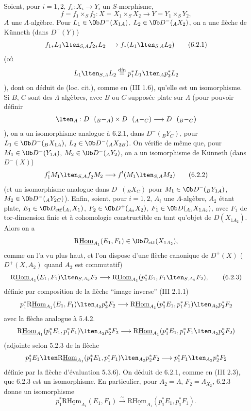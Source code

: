 Soient, pour $i=1,2$, $f_i:X_i\to Y_i$ un $S$-morphisme,
\[
f=f_1\times_S f_2:X=X_1\times_SX_2\longrightarrow Y=Y_1\times_SY_2,
\]
$A$ une $\Lambda$-algèbre.
Pour $L_1\in\Ob D^-(X_{1A})$, $L_2\in\Ob D^-({}_AX_2)$, on a une flèche de Künneth (dans $D^-(Y)$)
\begin{equation}
f_{1*}L_1\lten_{S,A}f_{2*}L_2
\longrightarrow
f_*(L_1\lten_{S,A}L_2)
\tag{6.2.1}
\end{equation}
(où
\[
L_1\lten_{S,A}L_2
\stackrel{\mathrm{dfn}}{=}p_1^*L_1\lten_Ap_2^*L_2
\]),
dont on déduit de (loc. cit.), comme en (III 1.6), qu'elle est un isomorphisme. Si $B$, $C$ sont des $\Lambda$-algèbres, avec $B$ ou $C$ supposée plate sur $\Lambda$ (pour pouvoir définir
\[
\lten_A:D^-({}_B{-}_A)\times D^-({}_A{-}_C)\longrightarrow D^-({}_B{-}_C)
\]),
on a un isomorphisme analogue à 6.2.1, dans $D^-({}_BY_C)$, pour $L_1\in\Ob D^-({}_BX_{1A})$, $L_2\in\Ob D^-({}_AX_{2B})$. On vérifie de même que, pour $M_1\in\Ob D^-(Y_{1A})$, $M_2\in\Ob D^-({}_AY_2)$, on a un isomorphisme de Künneth (dans $D^-(X)$)
\begin{equation}
f_1^!M_1\lten_{S,A}f_2^!M_2
\longrightarrow
f^!(M_1\lten_{S,A}M_2)
\tag{6.2.2}
\end{equation}
(et un isomorphisme analogue dans $D^-({}_B X_C)$ pour $M_1\in\Ob D^-({}_BY_{1A})$, $M_2\in\Ob D^-({}_AY_{2C})$). Enfin, soient, pour $i=1,2$, $A_i$ une $\Lambda$-algèbre, $A_2$ étant plate, $E_1\in\Ob D_{\mathrm{ctf}}({}_{A_1}X_1)$, $F_2\in\Ob D^+({}_{A_2}X_2)$, $F_1\in\Ob D({}_{A_1}X_{1A_2})$, avec $F_1$ de tor-dimension finie et à cohomologie constructible en tant qu'objet de $D(X_{1A_2})$. Alors on a
\[
\mathrm{R}\underline{\mathrm{Hom}}_{A_1}(E_1,F_1)\in\Ob D_{\mathrm{ctf}}(X_{1A_2}),
\]
comme on l'a vu plus haut, et l'on dispose d'une flèche canonique de $D^+(X)$ ($D^+(X,A_2)$ quand $A_2$ est commutatif)
\begin{equation}
\mathrm{R}\underline{\mathrm{Hom}}_{A_1}(E_1,F_1)\lten_{S,A_2}F_2
\longrightarrow
\mathrm{R}\underline{\mathrm{Hom}}_{A_1}(p_1^*E_1,F_1\lten_{S,A_2}F_2),
\tag{6.2.3}
\end{equation}
définie par composition de la flèche ``image inverse'' (III 2.1.1)
\[
p_1^*\mathrm{R}\underline{\mathrm{Hom}}_{A_1}(E_1,F_1)\lten_{A_2}p_2^*F_2
\longrightarrow
\mathrm{R}\underline{\mathrm{Hom}}_{A_1}(p_1^*E_1,p_1^*F_1)\lten_{A_2}p_2^*F_2
\]
avec la flèche analogue à 5.4.2.
\[
\mathrm{R}\underline{\mathrm{Hom}}_{A_1}(p_1^*E_1,p_1^*F_1)\lten_{A_2}p_2^*F_2
\longrightarrow
\mathrm{R}\underline{\mathrm{Hom}}_{A_1}(p_1^*E_1,p_1^*F_1\lten_{A_2}p_2^*F_2)
\]
(adjointe selon 5.2.3 de la flèche
\[
p_1^*E_1\lten\mathrm{R}\underline{\mathrm{Hom}}_{A_1}(p_1^*E_1,p_1^*F_1)\lten_{A_2}p_2^*F_2
\longrightarrow
p_1^*F_1\lten_{A_2}p_2^*F_2
\]
définie par la flèche d'évaluation 5.3.6). On déduit de 6.2.1, comme en (III 2.3), 
que 6.2.3 est un
isomorphisme. En particulier, pour $A_2=\Lambda$, $F_2=\Lambda_{X_2}$, 6.2.3 donne un isomorphisme
\begin{equation}
p_1^*\mathrm{R}\underline{\mathrm{Hom}}_{A_1}(E_1,F_1)
\xrightarrow{\sim}
\mathrm{R}\underline{\mathrm{Hom}}_{A_1}(p_1^*E_1,p_1^*F_1).
\tag{6.2.4}
\end{equation}

